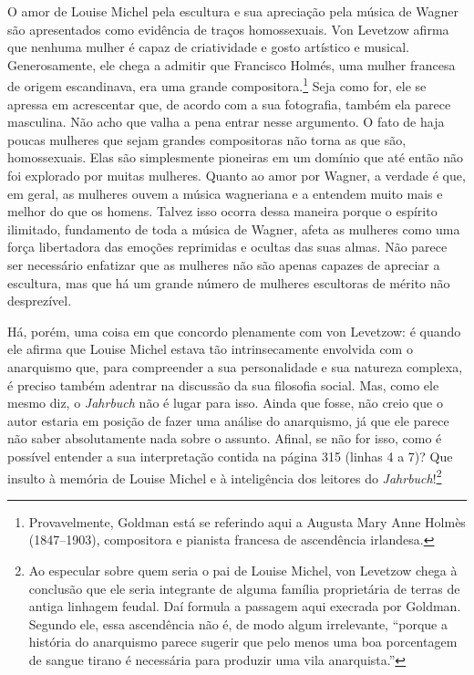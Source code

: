 O amor de Louise Michel pela escultura e sua apreciação pela música de
Wagner são apresentados como evidência de traços homossexuais. Von
Levetzow afirma que nenhuma mulher é capaz de criatividade e gosto
artístico e musical. Generosamente, ele chega a admitir que Francisco
Holmés, uma mulher francesa de origem escandinava, era uma grande
compositora.\footnote{Provavelmente, Goldman está se referindo aqui a
  Augusta Mary Anne Holmès (1847--1903), compositora e pianista francesa
  de ascendência irlandesa.} Seja como for, ele se apressa em
acrescentar que, de acordo com a sua fotografia, também ela parece masculina.
Não acho que valha a pena entrar nesse argumento. O fato de haja poucas
mulheres que sejam grandes compositoras não torna as que são,
homossexuais. Elas são simplesmente pioneiras em um domínio que até
então não foi explorado por muitas mulheres. Quanto ao amor por Wagner,
a verdade é que, em geral, as mulheres ouvem a música wagneriana e a
entendem muito mais e melhor do que os homens. Talvez isso ocorra dessa
maneira porque o espírito ilimitado, fundamento de toda a música de Wagner,
afeta as mulheres como uma força libertadora das emoções reprimidas e
ocultas das suas almas. Não parece ser necessário enfatizar que as
mulheres não são apenas capazes de apreciar a escultura, mas que há um
grande número de mulheres escultoras de mérito não desprezível.

Há, porém, uma coisa em que concordo plenamente com von Levetzow: é
quando ele afirma que Louise Michel estava tão intrinsecamente envolvida
com o anarquismo que, para compreender a sua personalidade e sua natureza
complexa, é preciso também adentrar na discussão da sua filosofia
social. Mas, como ele mesmo diz, o \textit{Jahrbuch} não é lugar para
isso. Ainda que fosse, não creio que o autor estaria em posição de fazer
uma análise do anarquismo, já que ele parece não saber absolutamente
nada sobre o assunto. Afinal, se não for isso, como é possível entender
a sua interpretação contida na página 315 (linhas 4 a 7)? Que insulto à
memória de Louise Michel e à inteligência dos leitores do
\textit{Jahrbuch}!\footnote{Ao especular sobre quem seria o pai de Louise
  Michel, von Levetzow chega à conclusão que ele seria integrante de
  alguma família proprietária de terras de antiga linhagem feudal. Daí
  formula a passagem aqui execrada por Goldman. Segundo ele, essa
  ascendência não é, de modo algum irrelevante, ``porque a história do
  anarquismo parece sugerir que pelo menos uma boa porcentagem de sangue
  tirano é necessária para produzir uma vila anarquista.''}

